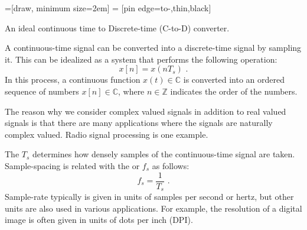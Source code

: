 \begin{marginfigure}
=[draw, minimum size=2em]
 = [pin edge={to-,thin,black}]
\begin{center}
\end{center}
\caption{An ideal continuous time to Discrete-time (C-to-D) converter.}
\end{marginfigure}


A continuous-time signal can be converted into a discrete-time signal
by sampling it. This can be idealized as a system that performs the following operation:
\begin{equation}
  \boxed{
    x[n] = x(n T_s)
    }\,\,.
\end{equation}
In this process, a continuous function $x(t) \in \mathbb{C}$ is converted into an ordered sequence of numbers $x[n] \in \mathbb{C}$, where $n\in\mathbb{Z}$ indicates the order of the numbers.

The reason why we consider complex valued signals in addition to real valued signals is that there are many applications where the signals are naturally complex valued. Radio signal processing is one example. 

The  $T_s$ determines how densely samples of the continuous-time signal are taken. Sample-spacing is related with the  or  $f_s$ as follows:
\begin{equation}
  \boxed{
    f_s = \frac{1}{T_s}
    }\,\,.
\end{equation}
Sample-rate typically is given in units of samples per second or hertz, but other units are also used in various applications. For example, the resolution of a digital image is often given in units of dots per inch (DPI).

